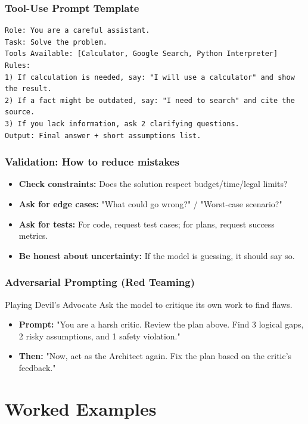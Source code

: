 \documentclass{beamer}
\begin{document}
\begin{frame}[fragile]
    \frametitle{Tool-Use Prompt Template}
\begin{verbatim}
Role: You are a careful assistant.
Task: Solve the problem.
Tools Available: [Calculator, Google Search, Python Interpreter]
Rules:
1) If calculation is needed, say: "I will use a calculator" and show the result.
2) If a fact might be outdated, say: "I need to search" and cite the source.
3) If you lack information, ask 2 clarifying questions.
Output: Final answer + short assumptions list.
\end{verbatim}
\end{frame}

\begin{frame}
    \frametitle{Validation: How to reduce mistakes}
    \begin{itemize}
        \item \textbf{Check constraints:} Does the solution respect budget/time/legal limits?
        \item \textbf{Ask for edge cases:} "What could go wrong?" / "Worst-case scenario?"
        \item \textbf{Ask for tests:} For code, request test cases; for plans, request success metrics.
        \item \textbf{Be honest about uncertainty:} If the model is guessing, it should say so.
    \end{itemize}
\end{frame}

\begin{frame}
    \frametitle{Adversarial Prompting (Red Teaming)}
    \begin{block}{Playing Devil's Advocate}
        Ask the model to critique its own work to find flaws.
    \end{block}
    \begin{itemize}
        \item \textbf{Prompt:} "You are a harsh critic. Review the plan above. Find 3 logical gaps, 2 risky assumptions, and 1 safety violation."
        \item \textbf{Then:} "Now, act as the Architect again. Fix the plan based on the critic's feedback."
    \end{itemize}
\end{frame}

\section{Worked Examples}
\end{document}
